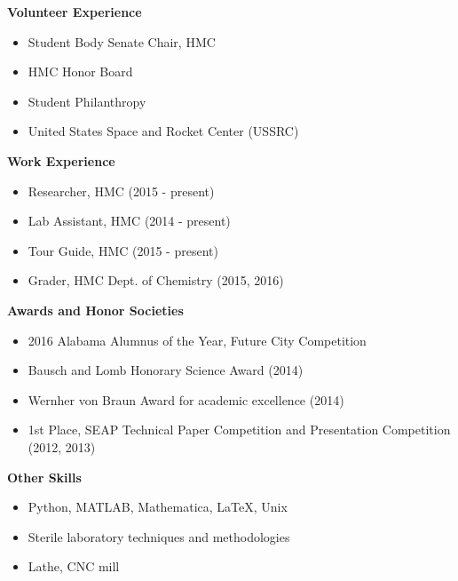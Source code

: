 \documentclass[9pt]{article}
\begin{document}
\begin{multicols*}{2}

\noindent
{\bf Volunteer Experience \\}
\vspace{-8mm}
	\begin{itemize}[leftmargin=3.75mm]
		\setlength{\itemsep}{0pt}
    	\setlength{\parskip}{0pt}
    	\setlength{\parsep}{0pt}
		\item Student Body Senate Chair, HMC
		\item HMC Honor Board
		\item Student Philanthropy
		\item United States Space and Rocket Center (USSRC)
	\end{itemize}

\noindent
{\bf Work Experience \\}
\vspace{-8mm}
	\begin{itemize}[leftmargin=3.75mm]
		\setlength{\itemsep}{0pt}
    	\setlength{\parskip}{0pt}
    	\setlength{\parsep}{0pt}
		\item Researcher, HMC (2015 - present)
		\item Lab Assistant, HMC (2014 - present)
		\item Tour Guide, HMC (2015 - present)
		\item Grader, HMC Dept. of Chemistry (2015, 2016)
	\end{itemize}

\vfill	
\columnbreak

\noindent
{\bf Awards and Honor Societies \\}
\vspace{-8mm}
	\begin{itemize}[leftmargin=3.75mm]
		\setlength{\itemsep}{0pt}
    	\setlength{\parskip}{0pt}
    	\setlength{\parsep}{0pt}
		\item 2016 Alabama Alumnus of the Year, Future City Competition
		\item Bausch and Lomb Honorary Science Award (2014)
		\item Wernher von Braun Award for academic excellence (2014) 
		\item 1st Place, SEAP Technical Paper Competition and Presentation 				Competition (2012, 2013)
	\end{itemize}

\noindent
{\bf Other Skills \\}
\vspace{-8mm}
	\begin{itemize}[leftmargin=3.75mm]
		\setlength{\itemsep}{0pt}
    	\setlength{\parskip}{0pt}
    	\setlength{\parsep}{0pt}
		\item Python, MATLAB, Mathematica, \LaTeX, Unix
		\item Sterile laboratory techniques and methodologies
		\item Lathe, CNC mill
	\end{itemize}

\end{multicols*}
%
%
\end{document}
